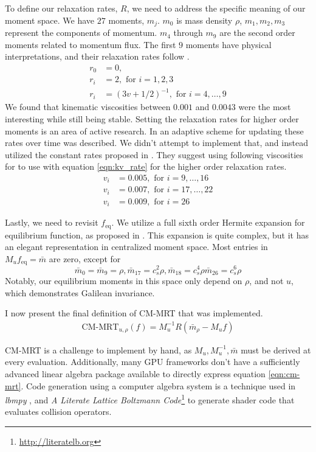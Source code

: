 To define our relaxation rates, $R$, we need to address
the specific meaning of our moment space.
We have $27$ moments, $m_j$.
$m_0$ is mass density $\rho$, 
$m_1, m_2, m_3$ represent the components of momentum.
$m_4$ through $m_9$ are the second order moments related
to momentum flux.
The first $9$ moments have physical interpretations,
and their relaxation rates follow \cite{Li2020, De2017}.
\begin{align}
  r_0 &= 0, \nonumber \\
  r_i &= 2, \text{ for } i = 1,2,3 \nonumber \\
  r_i &= (3v + 1 / 2)^{-1}, \text{ for } i = 4,\ldots, 9 \label{eqn:kv_rate}
\end{align}
We found that kinematic viscosities between 
$0.001$ and $0.0043$ were the most interesting while still being 
stable.
Setting the relaxation rates for higher order moments 
is an area of active research.
In \cite{Li2020} an adaptive scheme for updating these rates
over time was described.
We didn't attempt to implement that, 
and instead utilized the constant rates proposed in \cite{Li2018}.
They suggest using following viscosities for
to use with equation \ref{eqn:kv_rate}
for the higher order relaxation rates. 
\begin{align*}
  v_i &= 0.005, \text{ for } i = 9,\ldots, 16 \\
  v_i &= 0.007, \text{ for } i = 17, \ldots, 22 \\
  v_i &= 0.009, \text{ for } i = 26 
\end{align*}

Lastly, we need to revisit $f_{\text{eq}}$.
We utilize a full sixth order Hermite expansion for 
equilibrium function, as proposed in \cite{Shan2006}.
This expansion is quite complex, but it has an elegant
representation in centralized moment space.
Most entries in $M_u f_{\text{eq}} = \bar{m}$ are zero, 
except for
$$
\bar{m}_0 = \bar{m}_9 = \rho, \bar{m}_{17} = c_s^2 \rho, \bar{m}_{18} = c_s^4\rho \bar{m}_{26} = c_s^6 \rho
$$
Notably, our equilibrium moments in this space only depend on $\rho$,
and not $u$, which demonstrates Galilean invariance.

I now present the final definition of CM-MRT that was implemented.
\begin{align}
  \text{CM-MRT}_{u,\rho}(f) = M_u^{-1} R (\bar{m}_{\rho} - M_u f) \label{eqn:cm-mrt}
\end{align}

CM-MRT is a challenge to implement by hand, 
as $M_u, M_u^{-1}, \bar{m}$ must be derived at every evaluation.
Additionally, many GPU frameworks
don't have a sufficiently advanced linear algebra package available
to directly express equation \ref{eqn:cm-mrt}.
Code generation using a computer algebra system is a technique used 
in \textit{lbmpy} \cite{Hennig2023}, 
and \textit{A Literate Lattice Boltzmann Code}\footnote{\url{http://literatelb.org}}
to generate shader code that
evaluates collision operators.

